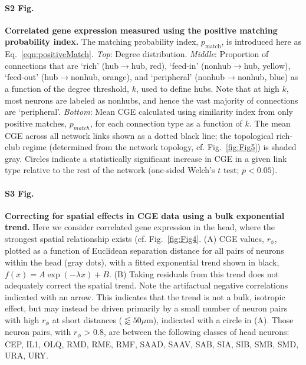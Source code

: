 \documentclass[10pt,letterpaper]{article}
\begin{document}
\paragraph*{S2 Fig.}
\label{S2_Fig}
{\bf Correlated gene expression measured using the positive matching probability index.} The matching probability index, $p_\mathrm{match}$, is introduced here as Eq.~\eqref{eqn:positiveMatch}.
\emph{Top}: Degree distribution.
\emph{Middle}: Proportion of connections that are `rich' (hub$\rightarrow$hub, red), `feed-in' (nonhub$\rightarrow$hub, yellow), `feed-out' (hub$\rightarrow$nonhub, orange), and `peripheral' (nonhub$\rightarrow$nonhub, blue) as a function of the degree threshold, $k$, used to define hubs.
Note that at high $k$, most neurons are labeled as nonhubs, and hence the vast majority of connections are `peripheral'.
\emph{Bottom}: Mean CGE calculated using similarity index from only positive matches, $p_{match}$, for each connection type as a function of $k$.
The mean CGE across all network links shown as a dotted black line; the topological rich-club regime (determined from the network topology, cf. Fig.~\ref{fig:Fig5}) is shaded gray.
Circles indicate a statistically significant increase in CGE in a given link type relative to the rest of the network (one-sided Welch's $t$ test; $p < 0.05$).


\paragraph*{S3 Fig.}
\label{S3_Fig}
{\bf Correcting for spatial effects in CGE data using a bulk exponential trend.}
  Here we consider correlated gene expression in the head, where the strongest spatial relationship exists (cf. Fig.~\ref{fig:Fig4}. (A) CGE values, $r_\phi$, plotted as a function of Euclidean separation distance for all pairs of neurons within the head (gray dots), with a fitted exponential trend shown in black, $f(x) = A\exp(-\lambda x) + B$.
(B) Taking residuals from this trend does not adequately correct the spatial trend.
    Note the artifactual negative correlations indicated with an arrow.
    This indicates that the trend is not a bulk, isotropic effect, but may instead be driven primarily by a small number of neuron pairs with high $r_\phi$ at short distances ($\lessapprox 50\mu$m), indicated with a circle in (A).
Those neuron pairs, with $r_\phi$ > 0.8, are between the following classes of head neurons: CEP, IL1, OLQ, RMD, RME, RMF, SAAD, SAAV, SAB, SIA, SIB, SMB, SMD, URA, URY.
\end{document}
